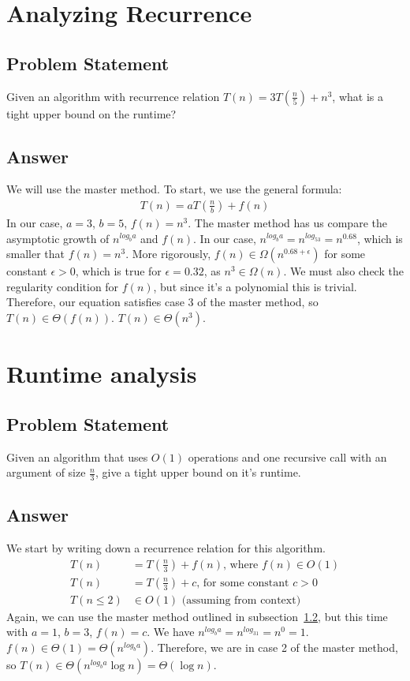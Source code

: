 \documentclass[a4paper,11pt]{article}
\begin{document}
	\section{Analyzing Recurrence}
	\subsection{Problem Statement}
	Given an algorithm with recurrence relation $T(n) = 3T(\frac{n}{5})+n^3$, what is a tight upper bound on the runtime?
	\subsection{Answer}\label{sub:master_method}
	We will use the master method. To start, we use the general formula:
	\begin{align}
		T(n) = aT(\frac{n}{b}) + f(n)
	\end{align}
	In our case, $a=3$, $b=5$, $f(n)=n^3$. The master method has us compare the asymptotic growth of $n^{log_ba}$ and $f(n)$. In our case, $n^{log_ba}=n^{log_53}=n^{0.68}$, which is smaller that $f(n)=n^3$. More rigorously, $f(n) \in \Omega(n^{0.68 + \epsilon})$ for some constant $\epsilon > 0$, which is true for $\epsilon = 0.32$, as $n^3 \in \Omega(n)$. We must also check the regularity condition for $f(n)$, but since it's a polynomial this is trivial. Therefore, our equation satisfies case 3 of the master method, so $T(n) \in \Theta (f(n))$. $T(n) \in \Theta (n^3).$

	\section{Runtime analysis}
	\subsection{Problem Statement}
	Given an algorithm that uses $O(1)$ operations and one recursive call with an argument of size $\frac{n}{3}$, give a tight upper bound on it's runtime.
	\subsection{Answer}
	We start by writing down a recurrence relation for this algorithm.
	\begin{align*}
		T(n) &= T(\frac{n}{3}) + f(n) \text{, where } f(n) \in O(1)\\
		T(n) &= T(\frac{n}{3}) + c \text{, for some constant } c > 0\\
		T(n \leq 2) &\in O(1) \text{ (assuming from context)}
	\end{align*}
	Again, we can use the master method outlined in subsection~\ref{sub:master_method}, but this time with $a=1$, $b=3$, $f(n) = c$. We have $n^{log_ba} = n^{log_31} = n^0 = 1$. $f(n) \in \Theta(1) = \Theta(n^{log_ba})$. Therefore, we are in case 2 of the master method, so $T(n)\in\Theta(n^{log_ba}\log n) = \Theta(\log n)$.
\end{document}
